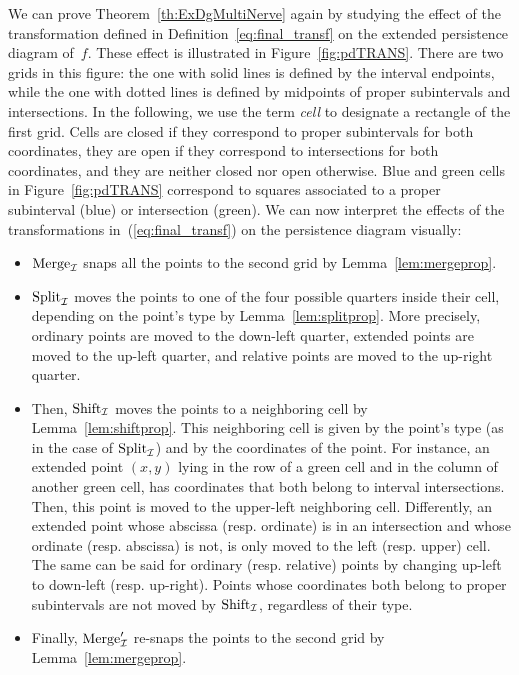 We can prove Theorem~\ref{th:ExDgMultiNerve} again by studying the effect of 
the transformation defined in Definition~\ref{eq:final_transf} on the extended persistence
diagram of~$f$. These effect is illustrated in
Figure~\ref{fig:pdTRANS}.  There are two grids in this figure: the one
with solid lines is defined by the interval endpoints, while the one
with dotted lines is defined by midpoints of proper subintervals and intersections.  In the following, we
use the term \textit{cell} to designate a rectangle of the first grid.
Cells are closed if they correspond to proper subintervals for both
coordinates, they are open if they correspond to intersections for
both coordinates, and they are neither closed nor open otherwise.
Blue and green cells in Figure~\ref{fig:pdTRANS} correspond to squares
associated to a proper subinterval (blue) or intersection (green). We
can now interpret the effects of the transformations
in~(\ref{eq:final_transf}) on the persistence diagram visually:
%
\begin{itemize}
\item $\mathrm{Merge}_{\mathcal{I}}$ snaps all the points to the second grid by
  Lemma~\ref{lem:mergeprop}.
%
\item $\mathrm{Split}_{\mathcal{I}}$ moves the points 
to one of the four possible quarters inside their cell, 
depending on the point's type by Lemma~\ref{lem:splitprop}.
More precisely, ordinary points are moved to the down-left quarter,
extended points are moved to the up-left quarter, and relative points are moved to the up-right quarter.
%
\item Then, $\mathrm{Shift}_{\mathcal{I}}$ moves the points to a neighboring cell by Lemma~\ref{lem:shiftprop}.
This neighboring cell is given by the point's type (as in the case of
$\mathrm{Split}_{\mathcal{I}}$) and by the coordinates of the point.  For instance, an
extended point $(x,y)$ lying in the row of a green cell and in the
column of another green cell, has coordinates that both belong to
interval intersections.
Then, this point is moved to the upper-left neighboring
cell. Differently, an extended point whose abscissa (resp. ordinate)
is in an intersection and whose ordinate (resp. abscissa) is not, is
only moved to the left (resp. upper) cell.  The same can be said for
ordinary (resp. relative) points by changing up-left to down-left
(resp. up-right).  Points whose coordinates both belong to proper
subintervals
are not moved by $\mathrm{Shift}_{\mathcal{I}}$, regardless of their type.
%
\item Finally, $\mathrm{Merge}'_{\mathcal{I}}$ re-snaps the points to the second grid by Lemma~\ref{lem:mergeprop}.
\end{itemize}
